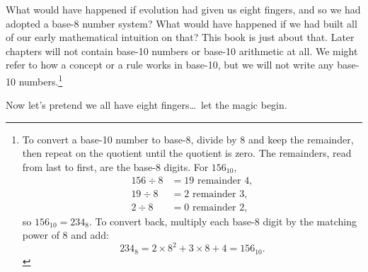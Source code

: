 What would have happened if evolution had given us eight fingers, and so we had adopted a base-$8$ number system? What would have happened if we had built all of our early mathematical intuition on that? This book is just about that. Later chapters will not contain base-10 numbers or base-10 arithmetic at all. We might refer to how a concept or a rule works in base-10, but we will not write any base-10 numbers.\footnote{To convert a base-10 number to base-8, divide by $8$ and keep the remainder, then repeat on the quotient until the quotient is zero. The remainders, read from last to first, are the base-8 digits. For $156_{10}$,
\begin{align*}
  156 \div 8 &= 19 \text{ remainder } 4, \\
  19 \div 8 &= 2 \text{ remainder } 3, \\
  2 \div 8 &= 0 \text{ remainder } 2,
\end{align*}
so $156_{10} = 234_{8}$. To convert back, multiply each base-8 digit by the matching power of $8$ and add:
\[
  234_{8} = 2 \times 8^{2} + 3 \times 8 + 4 = 156_{10}.
\]}

Now let's pretend we all have eight fingers\ldots\ let the magic begin.
